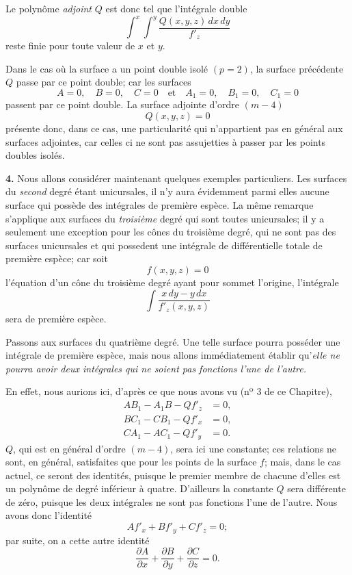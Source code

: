 \documentclass{article}
\begin{document}

Le polynôme \emph{adjoint} $Q$ est donc tel que l'intégrale double
\[
\int^{x} \int^{y} \frac{Q(x, y, z)\,dx\,dy}{f'_{z}}
\]
reste finie pour toute valeur de $x$ et $y$.

Dans le cas où la surface a un point double isolé $(p = 2)$, la surface précédente $Q$ passe par ce point double; car les surfaces
\[
A = 0, \quad B = 0, \quad C = 0 \quad \text{et} \quad A_{1} = 0, \quad B_{1} = 0, \quad C_{1} = 0
\]
passent par ce point double. La surface adjointe d'ordre $(m - 4)$
\[
Q(x, y, z) = 0
\]
présente donc, dans ce cas, une particularité qui n'appartient pas en général aux surfaces adjointes, car celles ci ne sont pas assujetties à passer par les points doubles isolés.

\textbf{4.} Nous allons considérer maintenant quelques exemples particuliers. Les surfaces du \emph{second} degré étant unicursales, il n'y aura évidemment parmi elles aucune surface qui possède des intégrales de première espèce. La même remarque s'applique aux surfaces du \emph{troisième} degré qui sont toutes unicursales; il y a seulement une exception pour les cônes du troisième degré, qui ne sont pas des surfaces unicursales et qui possedent une intégrale de différentielle totale de première espèce; car soit
\[
f(x, y, z) = 0
\]
l'équation d'un cône du troisième degré ayant pour sommet l'origine, l'intégrale
\[
\int \frac{x\,dy - y\,dx}{f'_{z}(x, y, z)}
\]
sera de première espèce.

Passons aux surfaces du quatrième degré. Une telle surface pourra posséder une intégrale de première espèce, mais nous allons immédiatement établir qu'\emph{elle ne pourra avoir deux intégrales qui ne soient pas fonctions l'une de l'autre.}


En effet, nous aurions ici, d'après ce que nous avons vu (nº 3 de ce Chapitre),
\[
\begin{aligned}
AB_{1} - A_{1}B - Qf'_{z} &= 0, \\
BC_{1} - CB_{1} - Qf'_{x} &= 0, \\
CA_{1} - AC_{1} - Qf'_{y} &= 0.
\end{aligned}
\]
$Q$, qui est en général d'ordre $(m - 4)$, sera ici une constante; ces relations ne sont, en général, satisfaites que pour les points de la surface $f$; mais, dans le cas actuel, ce seront des identités, puisque le premier membre de chacune d'elles est un polynôme de degré inférieur à quatre. D'ailleurs la constante $Q$ sera différente de zéro, puisque les deux intégrales ne sont pas fonctions l'une de l'autre. Nous avons donc l'identité
\[
Af'_{x} + Bf'_{y} + Cf'_{z} = 0;
\]
par suite, on a cette autre identité
\[
\frac{\partial A}{\partial x} + \frac{\partial B}{\partial y} + \frac{\partial C}{\partial z} = 0.
\]
\end{document}
